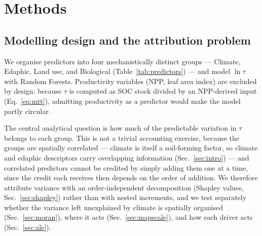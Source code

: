 %

\section{Methods}
\label{sec:methods}

\subsection{Modelling design and the attribution problem}
We organise predictors into four mechanistically distinct groups --- Climate,
Edaphic, Land use, and Biological (Table~\ref{tab:predictors}) --- and model
$\ln\tau$ with Random Forests. Productivity variables (NPP, leaf area index) are
excluded by design: because $\tau$ is computed as SOC stock divided by an
NPP-derived input (Eq.~\ref{eq:mtt}), admitting productivity as a predictor would
make the model partly circular.

The central analytical question is how much of the predictable variation in $\tau$
belongs to each group. This is not a trivial accounting exercise, because the
groups are spatially correlated --- climate is itself a soil-forming factor, so
climate and edaphic descriptors carry overlapping information (Sec.~\ref{sec:intro})
--- and correlated predictors cannot be credited by simply adding them one at a
time, since the credit each receives then depends on the order of addition. We
therefore attribute variance with an order-independent decomposition (Shapley
values, Sec.~\ref{sec:shapley}) rather than with nested increments, and we test
separately whether the variance left unexplained by climate is spatially organised
(Sec.~\ref{sec:moran}), where it acts (Sec.~\ref{sec:mapscale}), and how each
driver acts (Sec.~\ref{sec:ale}).

